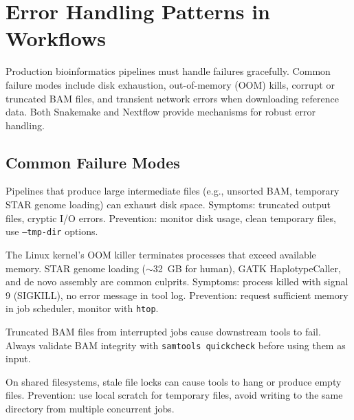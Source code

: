 \section{Error Handling Patterns in Workflows}
\label{sec:wf:errorhandling}

Production bioinformatics pipelines must handle failures gracefully. Common failure modes include disk exhaustion, out-of-memory (OOM) kills, corrupt or truncated BAM files, and transient network errors when downloading reference data. Both Snakemake and Nextflow provide mechanisms for robust error handling.

\subsection{Common Failure Modes}

\begin{description}[style=nextline, font=\bfseries, itemsep=3pt]
  \item[Disk full]
  Pipelines that produce large intermediate files (e.g., unsorted BAM, temporary STAR genome loading) can exhaust disk space. Symptoms: truncated output files, cryptic I/O errors. Prevention: monitor disk usage, clean temporary files, use \texttt{--tmp-dir} options.

  \item[OOM kill]
  The Linux kernel's OOM killer terminates processes that exceed available memory. STAR genome loading ($\sim$32~GB for human), GATK HaplotypeCaller, and de novo assembly are common culprits. Symptoms: process killed with signal 9 (SIGKILL), no error message in tool log. Prevention: request sufficient memory in job scheduler, monitor with \texttt{htop}.

  \item[Corrupt BAM/CRAM]
  Truncated BAM files from interrupted jobs cause downstream tools to fail. Always validate BAM integrity with \texttt{samtools quickcheck} before using them as input.

  \item[Stale NFS locks (HPC)]
  On shared filesystems, stale file locks can cause tools to hang or produce empty files. Prevention: use local scratch for temporary files, avoid writing to the same directory from multiple concurrent jobs.
\end{description}

